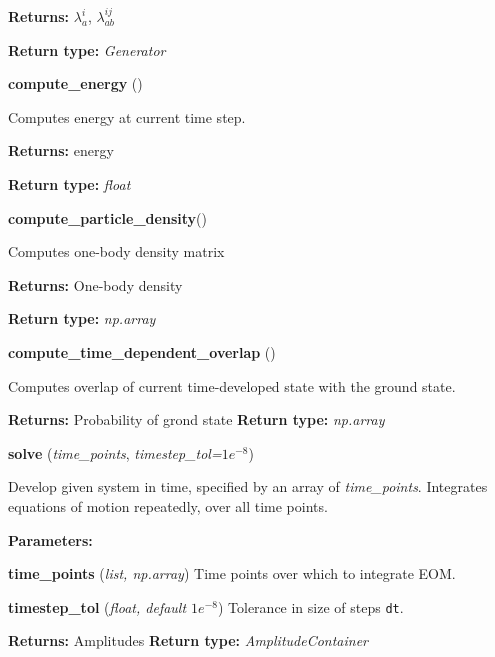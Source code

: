 \begin{tcolorbox}
{\begin{adjustwidth}{4em}{}
        \textbf{Returns:} $\lambda^i_a$, $\lambda^{ij}_{ab}$

        \textbf{Return type:} \emph{Generator}
        \end{adjustwidth}

    \hspace{2em} \textbf{compute\_energy} ()
        \begin{adjustwidth}{4em}{}
        Computes energy at current time step.

        \textbf{Returns:} energy

        \textbf{Return type:} \emph{float}
        \end{adjustwidth}

    \hspace{2em} \textbf{compute\_particle\_density}()
        \begin{adjustwidth}{4em}{}
        Computes one-body density matrix

        \textbf{Returns:} One-body density

        \textbf{Return type:} \emph{np.array}
        \end{adjustwidth}

    \hspace{2em} \textbf{compute\_time\_dependent\_overlap} ()
        \begin{adjustwidth}{4em}{}
        Computes overlap of current time-developed state with the ground state.

        \textbf{Returns:} Probability of grond state 
        \textbf{Return type:} \emph{np.array}
        \end{adjustwidth}

    \hspace{2em} \textbf{solve} (\emph{time\_points}, \emph{timestep\_tol=$1e^{-8}$})
        \begin{adjustwidth}{4em}{}
        Develop given system in time, specified by an array of \emph{time\_points}.
        Integrates equations of motion repeatedly, over all time points.
        
        \textbf{Parameters:}

            \hspace{1.5em} \textbf{time\_points} (\emph{list, np.array})
                Time points over which to integrate EOM.

            \hspace{1.5em} \textbf{timestep\_tol} (\emph{float, default $1e^{-8}$})
                Tolerance in size of steps \lstinline{dt}.

        \textbf{Returns:} Amplitudes
        \textbf{Return type:} \emph{AmplitudeContainer}
        \end{adjustwidth}

    } 
\end{tcolorbox}